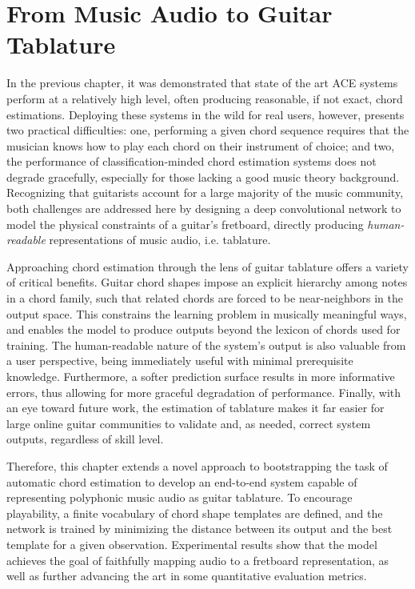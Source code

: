 


\graphicspath{{6/figures/}}

\chapter{From Music Audio to Guitar Tablature}
\label{chp:background}

In the previous chapter, it was demonstrated that state of the art ACE systems perform at a relatively high level, often producing reasonable, if not exact, chord estimations.
Deploying these systems in the wild for real users, however, presents two practical difficulties:
one, performing a given chord sequence requires that the musician knows how to play each chord on their instrument of choice;
and two, the performance of classification-minded chord estimation systems does not degrade gracefully, especially for those lacking a good music theory background.
Recognizing that guitarists account for a large majority of the music community, both challenges are addressed here by designing a deep convolutional network to model the physical constraints of a guitar's fretboard, directly producing \emph{human-readable} representations of music audio, i.e. tablature.

Approaching chord estimation through the lens of guitar tablature offers a variety of critical benefits.
Guitar chord shapes impose an explicit hierarchy among notes in a chord family, such that related chords are forced to be near-neighbors in the output space.
This constrains the learning problem in musically meaningful ways, and enables the model to produce outputs beyond the lexicon of chords used for training.
The human-readable nature of the system's output is also valuable from a user perspective, being immediately useful with minimal prerequisite knowledge.
Furthermore, a softer prediction surface results in more informative errors, thus allowing for more graceful degradation of performance.
Finally, with an eye toward future work, the estimation of tablature makes it far easier for large online guitar communities to validate and, as needed, correct system outputs, regardless of skill level.

Therefore, this chapter extends a novel approach to bootstrapping the task of automatic chord estimation to develop an end-to-end system capable of representing polyphonic music audio as guitar tablature.
To encourage playability, a finite vocabulary of chord shape templates are defined, and the network is trained by minimizing the distance between its output and the best template for a given observation.
Experimental results show that the model achieves the goal of faithfully mapping audio to a fretboard representation, as well as further advancing the art in some quantitative evaluation metrics.


